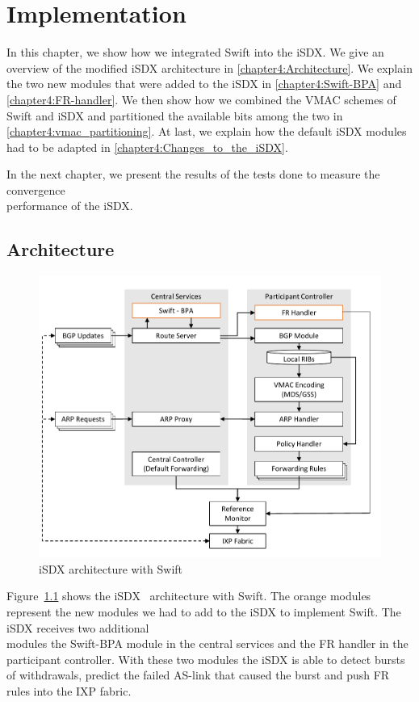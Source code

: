 \chapter{\label{chapter4}Implementation}

In this chapter, we show how we integrated Swift into the iSDX. We give an overview of the modified iSDX architecture in \ref{chapter4:Architecture}. We explain the two new modules that were added to the iSDX in \ref{chapter4:Swift-BPA} and  \ref{chapter4:FR-handler}. We then show how we combined the VMAC schemes of Swift and iSDX and partitioned the available bits among the two in \ref{chapter4:vmac_partitioning}. At last, we explain how the default iSDX modules had to be adapted in \ref{chapter4:Changes_to_the_iSDX}.

In the next chapter, we present the results of the tests done to measure the convergence \\ performance of the iSDX.

\section{\label{chapter4:Architecture}Architecture}

\begin{figure}[h]
\center
\includegraphics[scale = 0.5]{Figures/design_sdx_swift_cropped.pdf}
\caption{iSDX architecture with Swift}
\label{fig:isdx_architecture_with_swift}
\end{figure}

Figure~\ref{fig:isdx_architecture_with_swift} shows the iSDX~\cite{feamster2013sdx} architecture with Swift. The orange modules represent the new modules we had to add to the iSDX to implement Swift. The iSDX receives two additional \\modules the Swift-BPA module in the central services and the FR handler in the participant controller. With these two modules the iSDX is able to detect bursts of withdrawals, predict the failed AS-link that caused the burst and push FR rules into the IXP fabric.

